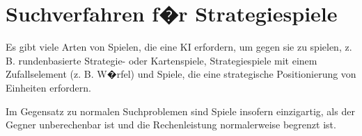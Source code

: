 \chapter{Suchverfahren f�r Strategiespiele}

Es gibt viele Arten von Spielen, die eine KI erfordern, um gegen sie zu spielen, z. B. rundenbasierte Strategie- oder Kartenspiele, Strategiespiele mit einem Zufallselement (z. B. W�rfel) und Spiele, die eine strategische Positionierung von Einheiten erfordern.

Im Gegensatz zu normalen Suchproblemen sind Spiele insofern einzigartig, als der Gegner unberechenbar ist und die Rechenleistung normalerweise begrenzt ist.



